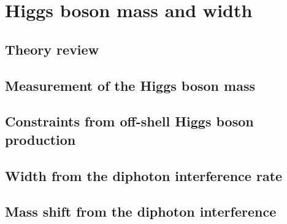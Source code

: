 \documentclass[../report.tex]{subfiles}
\providecommand{\main}{..}
\begin{document}
\section{Higgs boson mass and width}\label{sec5}

\subsection{Theory review}



\subsection{Measurement of the Higgs boson mass}



\subsection{Constraints from off-shell Higgs boson production}

\label{sec:5_offshell}

\subsection{Width from the diphoton interference rate}
\label{sec:5_interference_real}


\subsection{Mass shift from the diphoton interference}
\label{sec:5_interference_imag}





%
%
\end{document}
